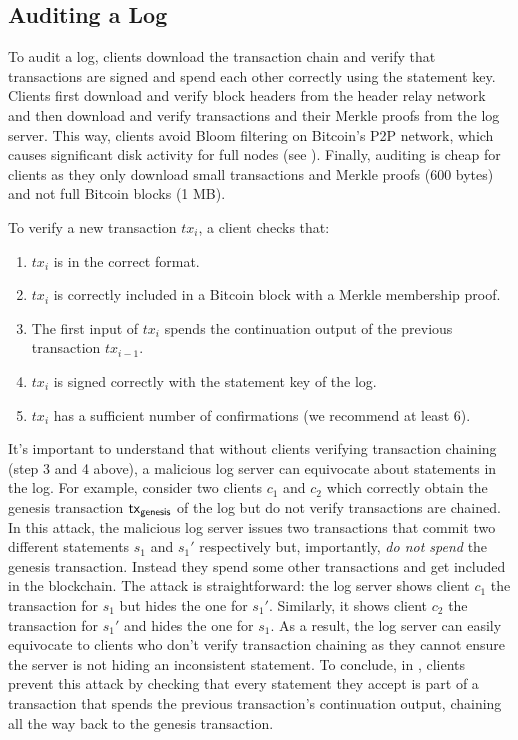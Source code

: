 \subsection{Auditing a \Sys Log}
\label{sec:catena:design:auditing}
To audit a log, clients download the \Sys transaction chain and verify that transactions are signed and spend each other correctly using the statement key.
Clients first download and verify block headers from the header relay network and then download and verify \Sys transactions and their Merkle proofs from the log server.
This way, \Sys clients avoid Bloom filtering on Bitcoin's P2P network, which causes significant disk activity for full nodes (see ).
Finally, auditing is cheap for \Sys clients as they only download small transactions and Merkle proofs (600 bytes) and not full Bitcoin blocks (1 MB).

To verify a new \Sys transaction $tx_i$, a client checks that:
\begin{enumerate}
\item $tx_i$ is in the correct \Sys format.
\item $tx_i$ is correctly included in a Bitcoin block with a Merkle membership proof.
\item The first input of $tx_i$ spends the continuation output of the previous \Sys transaction $tx_{i-1}$.
\item $tx_i$ is signed correctly with the statement key of the log.
\item $tx_i$ has a sufficient number of confirmations (we recommend at least 6).
\end{enumerate}

It's important to understand that without clients verifying transaction chaining (\ie step 3 and 4 above), a malicious log server can equivocate about statements in the log.
For example, consider two \Sys clients $c_1$ and $c_2$ which correctly obtain the genesis transaction $\mathsf{tx}_{\textsf{genesis}}$ of the log but do not verify transactions are chained.
In this attack, the malicious log server issues two \Sys transactions that commit two different statements $s_1$ and $s_1'$ respectively but, importantly,  \emph{do not spend} the genesis transaction.
Instead they spend some other transactions and get included in the blockchain.
The attack is straightforward: the log server shows client $c_1$ the transaction for $s_1$ but hides the one for $s_1'$.
Similarly, it shows client $c_2$ the transaction for $s_1'$ and hides the one for $s_1$.
As a result, the log server can easily equivocate to clients who don't verify transaction chaining as they cannot ensure the server is not hiding an inconsistent statement.
To conclude, in \Sys, clients prevent this attack by checking that every statement they accept is part of a transaction that spends the previous transaction's continuation output, chaining all the way back to the genesis transaction.


